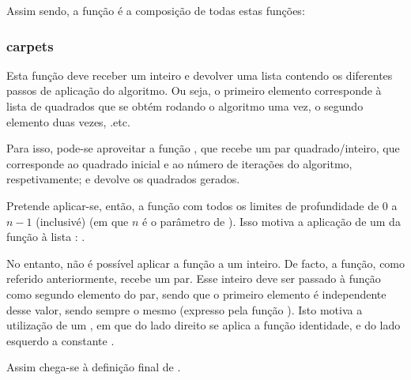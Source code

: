 \documentclass[a4paper]{article}
\begin{document}
Assim sendo, a função  é a composição de todas estas funções:


\subsubsection*{carpets}

Esta função deve receber um inteiro e devolver uma lista contendo os diferentes passos de aplicação do algoritmo. Ou seja, o primeiro elemento corresponde à lista de quadrados que se obtém rodando o algoritmo uma vez, o segundo elemento duas vezes, .etc.

Para isso, pode-se aproveitar a função , que recebe um par quadrado/inteiro, que corresponde ao quadrado inicial e ao número de iterações do algoritmo, respetivamente; e devolve os quadrados gerados.

Pretende aplicar-se, então, a função  com todos os limites de profundidade de 0 a $n - 1$ (inclusivé) (em que $n$ é o parâmetro de ). Isso motiva a aplicação de um  da função  à lista : .


No entanto, não é possível aplicar a função  a um inteiro. De facto, a função, como referido anteriormente, recebe um par. Esse inteiro deve ser passado à função como segundo elemento do par, sendo que o primeiro elemento é independente desse valor, sendo sempre o mesmo (expresso pela função ). Isto motiva a utilização de um , em que do lado direito se aplica a função identidade, e do lado esquerdo a constante .

Assim chega-se à definição final de .

\end{document}
